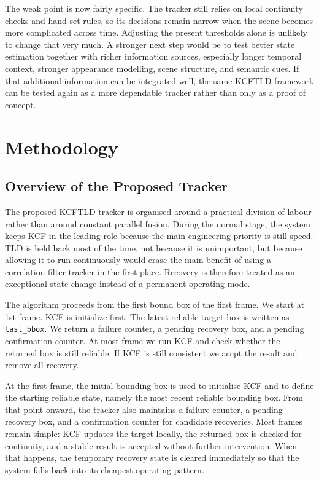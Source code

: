 \documentclass[12pt,a4paper]{article}
\begin{document}
The weak point is now fairly specific. The tracker still relies on local continuity checks and hand-set rules, so its decisions remain narrow when the scene becomes more complicated across time. Adjusting the present thresholds alone is unlikely to change that very much. A stronger next step would be to test better state estimation together with richer information sources, especially longer temporal context, stronger appearance modelling, scene structure, and semantic cues. If that additional information can be integrated well, the same KCF\textendash TLD framework can be tested again as a more dependable tracker rather than only as a proof of concept.

\section{Methodology}

\subsection{Overview of the Proposed Tracker}
The proposed KCF\textendash TLD tracker is organised around a practical division of labour rather than around constant parallel fusion. During the normal stage, the system keeps KCF in the leading role because the main engineering priority is still speed. TLD is held back most of the time, not because it is unimportant, but because allowing it to run continuously would erase the main benefit of using a correlation-filter tracker in the first place. Recovery is therefore treated as an exceptional state change instead of a permanent operating mode.

The algorithm proceeds from the first bound box of the first frame. We start at 1st frame. KCF is initialize first. The latest reliable target box is written as \texttt{last\_bbox}. We return a failure counter, a pending recovery box, and a pending confirmation counter. At most frame we run KCF and check whether the returned box is still reliable. If KCF is still consistent we accpt the result and remove all recovery.

At the first frame, the initial bounding box is used to initialise KCF and to define the starting reliable state, namely the most recent reliable bounding box. From that point onward, the tracker also maintains a failure counter, a pending recovery box, and a confirmation counter for candidate recoveries. Most frames remain simple: KCF updates the target locally, the returned box is checked for continuity, and a stable result is accepted without further intervention. When that happens, the temporary recovery state is cleared immediately so that the system falls back into its cheapest operating pattern.
\end{document}
